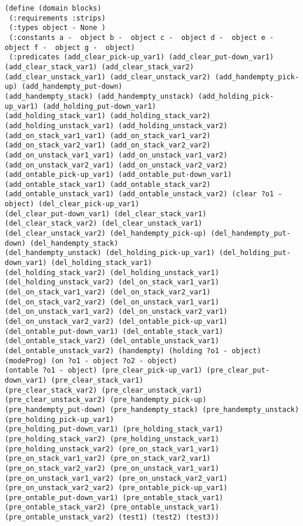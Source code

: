 \begin{scriptsize}  
\begin{verbatim}
(define (domain blocks)
 (:requirements :strips)
 (:types object - None )
 (:constants a -  object b -  object c -  object d -  object e -  object f -  object g -  object)
 (:predicates (add_clear_pick-up_var1) (add_clear_put-down_var1) (add_clear_stack_var1) (add_clear_stack_var2) 
(add_clear_unstack_var1) (add_clear_unstack_var2) (add_handempty_pick-up) (add_handempty_put-down) 
(add_handempty_stack) (add_handempty_unstack) (add_holding_pick-up_var1) (add_holding_put-down_var1) 
(add_holding_stack_var1) (add_holding_stack_var2) (add_holding_unstack_var1) (add_holding_unstack_var2) 
(add_on_stack_var1_var1) (add_on_stack_var1_var2) (add_on_stack_var2_var1) (add_on_stack_var2_var2) 
(add_on_unstack_var1_var1) (add_on_unstack_var1_var2) (add_on_unstack_var2_var1) (add_on_unstack_var2_var2) 
(add_ontable_pick-up_var1) (add_ontable_put-down_var1) (add_ontable_stack_var1) (add_ontable_stack_var2) 
(add_ontable_unstack_var1) (add_ontable_unstack_var2) (clear ?o1 - object) (del_clear_pick-up_var1) 
(del_clear_put-down_var1) (del_clear_stack_var1) (del_clear_stack_var2) (del_clear_unstack_var1) 
(del_clear_unstack_var2) (del_handempty_pick-up) (del_handempty_put-down) (del_handempty_stack) 
(del_handempty_unstack) (del_holding_pick-up_var1) (del_holding_put-down_var1) (del_holding_stack_var1) 
(del_holding_stack_var2) (del_holding_unstack_var1) (del_holding_unstack_var2) (del_on_stack_var1_var1) 
(del_on_stack_var1_var2) (del_on_stack_var2_var1) (del_on_stack_var2_var2) (del_on_unstack_var1_var1) 
(del_on_unstack_var1_var2) (del_on_unstack_var2_var1) (del_on_unstack_var2_var2) (del_ontable_pick-up_var1) 
(del_ontable_put-down_var1) (del_ontable_stack_var1) (del_ontable_stack_var2) (del_ontable_unstack_var1) 
(del_ontable_unstack_var2) (handempty) (holding ?o1 - object) (modeProg) (on ?o1 - object ?o2 - object) 
(ontable ?o1 - object) (pre_clear_pick-up_var1) (pre_clear_put-down_var1) (pre_clear_stack_var1) 
(pre_clear_stack_var2) (pre_clear_unstack_var1) (pre_clear_unstack_var2) (pre_handempty_pick-up) 
(pre_handempty_put-down) (pre_handempty_stack) (pre_handempty_unstack) (pre_holding_pick-up_var1) 
(pre_holding_put-down_var1) (pre_holding_stack_var1) (pre_holding_stack_var2) (pre_holding_unstack_var1) 
(pre_holding_unstack_var2) (pre_on_stack_var1_var1) (pre_on_stack_var1_var2) (pre_on_stack_var2_var1) 
(pre_on_stack_var2_var2) (pre_on_unstack_var1_var1) (pre_on_unstack_var1_var2) (pre_on_unstack_var2_var1) 
(pre_on_unstack_var2_var2) (pre_ontable_pick-up_var1) (pre_ontable_put-down_var1) (pre_ontable_stack_var1) 
(pre_ontable_stack_var2) (pre_ontable_unstack_var1) (pre_ontable_unstack_var2) (test1) (test2) (test3))


\end{verbatim}
\end{scriptsize}
